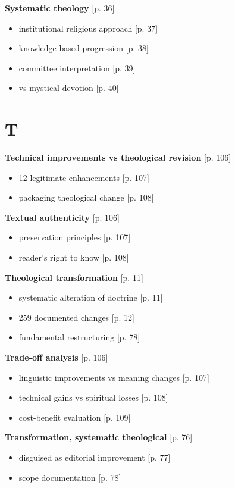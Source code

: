 \documentclass[11pt,twoside]{book}
\begin{document}
\textbf{\textbf{Systematic theology}} {[}p. 36]
\begin{itemize}
\item institutional religious approach [p. 37]
\item knowledge-based progression [p. 38]
\item committee interpretation [p. 39]
\item vs mystical devotion [p. 40]
\end{itemize}
\section*{T}
\label{sec:orge99cec6}

\textbf{\textbf{Technical improvements vs theological revision}} {[}p. 106]
\begin{itemize}
\item 12 legitimate enhancements [p. 107]
\item packaging theological change [p. 108]
\end{itemize}

\textbf{\textbf{Textual authenticity}} {[}p. 106]
\begin{itemize}
\item preservation principles [p. 107]
\item reader's right to know [p. 108]
\end{itemize}

\textbf{\textbf{Theological transformation}} {[}p. 11]
\begin{itemize}
\item systematic alteration of doctrine [p. 11]
\item 259 documented changes [p. 12]
\item fundamental restructuring [p. 78]
\end{itemize}

\textbf{\textbf{Trade-off analysis}} {[}p. 106]
\begin{itemize}
\item linguistic improvements vs meaning changes [p. 107]
\item technical gains vs spiritual losses [p. 108]
\item cost-benefit evaluation [p. 109]
\end{itemize}

\textbf{\textbf{Transformation, systematic theological}} {[}p. 76]
\begin{itemize}
\item disguised as editorial improvement [p. 77]
\item scope documentation [p. 78]
\end{itemize}
\end{document}
